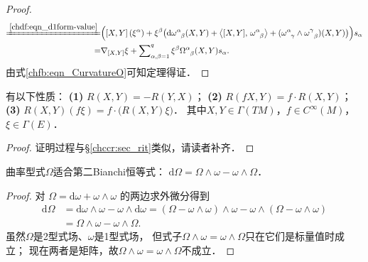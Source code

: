 \begin{proof}
\begin{align*}
   \xlongequal{\ref{chdf:eqn_d1form-value}}&\Bigl( \left[X,Y\right](\xi^\alpha)
   +\xi^\beta \bigl( \mathrm{d}\omega_{\hphantom{\alpha}\beta}^\alpha (X,Y)
   +\left< [X,Y],\, \omega_{\hphantom{\alpha}\beta}^\alpha\right> 
   + (\omega_{\hphantom{\alpha}\gamma}^\alpha \wedge \omega_{\hphantom{\alpha}\beta}^\gamma)(X,Y)
    \bigr)  \Bigr)s_\alpha  \\
   =&\nabla_{[X,Y]} \xi + \sum\nolimits_{\alpha,\beta=1}^{q} 
   \xi^\beta \Omega_{\hphantom{\alpha}\beta}^\alpha (X,Y) s_\alpha .
\end{align*} %
由式\eqref{chfb:eqn_CurvatureO}可知定理得证．
\end{proof}




\begin{theorem}\label{chfb:thm_RP}
    有以下性质：
    {\bfseries (1)} $R(X, Y)=-R(Y, X)$；
    {\bfseries (2)} $R(f X, Y)=f \cdot R(X, Y)$；
    {\bfseries (3)} $R(X, Y)(f \xi)=f \cdot\bigl(R(X, Y) \xi\bigr)$．
    其中$X, Y \in \Gamma(TM)$，$ f \in C^{\infty}(M)$，$ \xi \in \Gamma(E)$．
\end{theorem}
\begin{proof}
    证明过程与\S\ref{chccr:sec_rit}类似，请读者补齐．
\end{proof}


\begin{theorem}\label{chfb:thm_2ndBianchi}
    曲率型式$\Omega$适合第二Bianchi恒等式：
    $ \mathrm{d} \Omega = \Omega \wedge \omega - \omega \wedge \Omega $．
\end{theorem}
\begin{proof}
对 $\Omega=\mathrm{d} \omega + \omega \wedge \omega$ 的两边求外微分得到
\begin{align*}
    \mathrm{d} \Omega & =\mathrm{d} \omega \wedge \omega- \omega \wedge \mathrm{d} \omega 
     =(\Omega-\omega \wedge \omega) \wedge \omega-\omega \wedge(\Omega-\omega \wedge \omega) \\
    & =\Omega \wedge \omega-\omega \wedge \Omega.
\end{align*}
虽然$\Omega$是2型式场、$\omega$是1型式场，
但式子$\Omega \wedge \omega=\omega \wedge \Omega$只在它们是标量值时成立；
现在两者是矩阵，故$\Omega \wedge \omega=\omega \wedge \Omega$不成立．
\end{proof}







